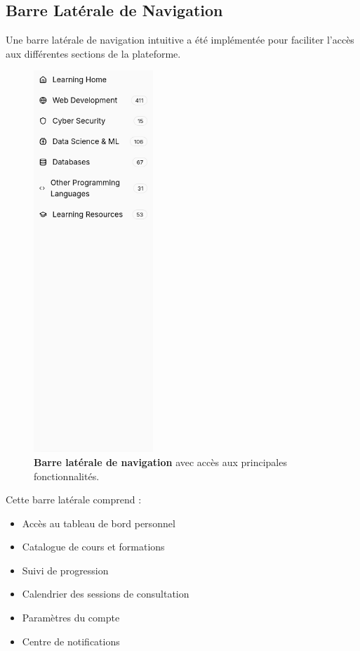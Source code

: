 \subsection{Barre Latérale de Navigation}

Une barre latérale de navigation intuitive a été implémentée pour faciliter l'accès aux différentes sections de la plateforme.

\begin{figure}[h!]
  \centering
  \includegraphics[width=0.4\textwidth,keepaspectratio]{week_3_img/sidebare.png}
  \caption{\textbf{Barre latérale de navigation} avec accès aux principales fonctionnalités.}
  \label{fig:sidebar_nav}
\end{figure}

Cette barre latérale comprend :
\begin{itemize}
  \item Accès au tableau de bord personnel
  \item Catalogue de cours et formations
  \item Suivi de progression
  \item Calendrier des sessions de consultation
  \item Paramètres du compte
  \item Centre de notifications
\end{itemize}


